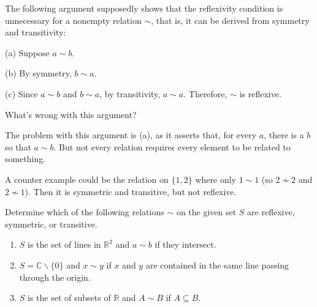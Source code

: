 \documentclass[11pt,dvipsnames]{book}
\numberwithin{figure}{section} %
\numberwithin{table}{section} %
\begin{document}
\begin{exercise}
 The following argument supposedly shows that the reflexivity condition is unnecessary for a nonempty relation $\sim$, that is, it can be derived from symmetry and transitivity:

(a) Suppose $a\sim b$.

(b) By symmetry, $b\sim a$.

(c) Since $a\sim b$ and $b\sim a$, by transitivity, $a\sim a$. Therefore, $\sim $  is reflexive.

What's wrong with this argument?

\begin{solution}
The problem with this argument is (a), as it asserts that, for every $a$, there is a $b$ so that $a\sim b$. But not every relation requires every element to be related to something.

A counter example could be the relation on $\{1,2\}$ where only $1\sim 1$ (so $2\not\sim 2$ and $2\not\sim 1$). Then it is symmetric and transitive, but not reflexive.
\end{solution}
\end{exercise}

\begin{exercise}
Determine which of the following relations $\sim$ on the given set $S$ are reflexive, symmetric, or transitive.
\begin{enumerate}
\item $S$ is the set of lines in $\mathbb{R}^{2}$ and $a\sim b$ if they intersect.
\item $S=\mathbb{C}\backslash \{0\}$ and $x\sim y$ if $x$ and $y$ are contained in the same line passing through the origin.
\item $S$ is the set of subsets of $\mathbb{R}$ and $A\sim B$ if $A\subseteq B$.

\end{enumerate}

\end{exercise}
\end{document}
